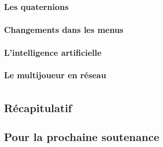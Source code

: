 \documentclass{article}
\begin{document}
\subsubsection{Les quaternions}
\subsubsection{Changements dans les menus}
\subsubsection{L'intelligence artificielle}
\subsubsection{Le multijoueur en réseau}

\section{}
\subsection{Récapitulatif}
\subsection{Pour la prochaine soutenance}
\end{document}
